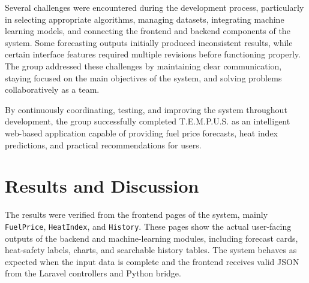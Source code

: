 \documentclass[12pt]{article}
\begin{document}
Several challenges were encountered during the development process, particularly in selecting appropriate algorithms, managing datasets, integrating machine learning models, and connecting the frontend and backend components of the system. Some forecasting outputs initially produced inconsistent results, while certain interface features required multiple revisions before functioning properly. The group addressed these challenges by maintaining clear communication, staying focused on the main objectives of the system, and solving problems collaboratively as a team.

By continuously coordinating, testing, and improving the system throughout development, the group successfully completed T.E.M.P.U.S. as an intelligent web-based application capable of providing fuel price forecasts, heat index predictions, and practical recommendations for users.

\section{Results and Discussion}

The results were verified from the frontend pages of the system, mainly \texttt{FuelPrice}, \texttt{HeatIndex}, and \texttt{History}. These pages show the actual user-facing outputs of the backend and machine-learning modules, including forecast cards, heat-safety labels, charts, and searchable history tables. The system behaves as expected when the input data is complete and the frontend receives valid JSON from the Laravel controllers and Python bridge.
 
\end{document}
